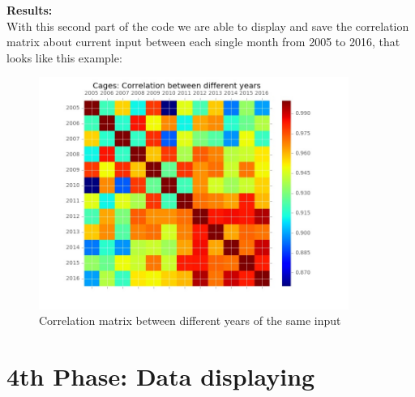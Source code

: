 \begin{minipage}{0.5\textwidth}
\textbf{Results:} \\
With this second part of the code we are able to display and save the correlation matrix about current input between each single month from 2005 to 2016, that looks like this example:
\end{minipage} \hfill
\begin{minipage}{0.45\textwidth}
\begin{figure}[H]
    \includegraphics[width=0.9\textwidth]{Files/Cages_Years_Matrix.jpg}
    \caption{Correlation matrix between different years of the same input}
\end{figure}
\end{minipage}







\newpage
\section{4th Phase: Data displaying}
\iffalse

